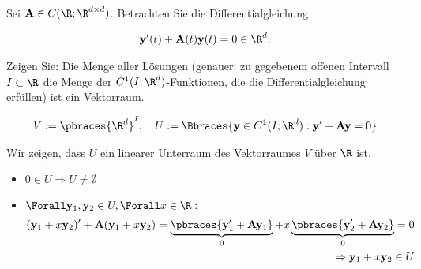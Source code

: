 \begin{exercise}

Sei $\mathbf{A} \in C(\R; \R^{d \times d})$. Betrachten Sie die Differentialgleichung

\begin{align*}
  \mathbf{y}^\prime(t) + \mathbf{A}(t) \mathbf{y}(t) = 0 \in \R^d.
\end{align*}

Zeigen Sie: Die Menge aller Lösungen (genauer: zu gegebenem offenen Intervall $I \subset \R$ die Menge der $C^1(I; \R^d)$-Funktionen, die die Differentialgleichung erfüllen) ist ein Vektorraum.

\end{exercise}

\begin{solution}

\begin{align*}
  V := \pbraces{\R^d}^I,
  \quad
  U := \Bbraces
  {
    \mathbf{y} \in C^1(I; \R^d):
    \mathbf{y}^\prime + \mathbf{A} \mathbf{y} = 0
  }
\end{align*}

Wir zeigen, dass $U$ ein linearer Unterraum des Vektorraumes $V$ über $\R$ ist.

\begin{itemize}

  \item $0 \in U
  \Rightarrow
  U \neq \emptyset$

  \item $\Forall \mathbf{y}_1, \mathbf{y}_2 \in U, \Forall x \in \R:$
  \begin{align*}
    (\mathbf{y}_1 + x \mathbf{y}_2)^\prime +
    \mathbf{A}
    (\mathbf{y}_1 + x \mathbf{y}_2)
    =
    \underbrace{\pbraces{
      \mathbf{y}_1^\prime + \mathbf{A} \mathbf{y}_1
    }}_0 +
    x
    \underbrace{\pbraces{
    \mathbf{y}_2^\prime + \mathbf{A} \mathbf{y}_2
    }}_0
    = 0 \\
    \Rightarrow \mathbf{y}_1 + x \mathbf{y}_2 \in U
  \end{align*}

\end{itemize}

\end{solution}
